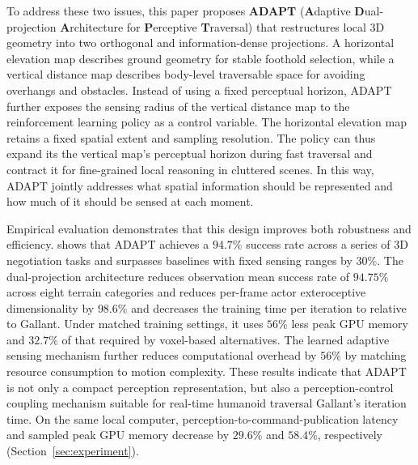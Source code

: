 \documentclass[letterpaper, 10 pt, conference]{ieeeconf/ieeeconf}
\providecommand{\DIFadd}[1]{{\protect\color{blue} \sf #1}} %
\providecommand{\DIFdel}[1]{{\protect\color{red} \scriptsize #1}} %
\providecommand{\DIFaddbegin}{} %
\providecommand{\DIFaddend}{} %
\providecommand{\DIFdelbegin}{} %
\providecommand{\DIFdelend}{} %
\begin{document}
To address these two issues, this paper proposes \textbf{ADAPT} (\textbf{A}daptive \textbf{D}ual-projection \textbf{A}rchitecture for \textbf{P}erceptive \textbf{T}raversal) that restructures local 3D geometry into two orthogonal and information-dense projections. A horizontal elevation map describes ground geometry for stable foothold selection, while a vertical distance map describes body-level traversable space for avoiding overhangs and obstacles. Instead of using a fixed perceptual horizon, ADAPT further exposes the sensing radius of the vertical distance map to the reinforcement learning policy as a control variable. The \DIFaddbegin \DIFadd{horizontal elevation map retains a fixed spatial extent and sampling resolution. The }\DIFaddend policy can thus expand \DIFdelbegin \DIFdel{its }\DIFdelend \DIFaddbegin \DIFadd{the vertical map's }\DIFaddend perceptual horizon during fast traversal and contract it for fine-grained local reasoning in cluttered scenes. In this way, ADAPT jointly addresses what spatial information should be represented and how much of it should be sensed at each moment.

Empirical evaluation \DIFdelbegin \DIFdel{demonstrates that this design improves both robustness and efficiency. }\DIFdelend \DIFaddbegin \DIFadd{shows that }\DIFaddend ADAPT achieves a \DIFdelbegin \DIFdel{$94.7\%$ success rate across a series of 3D negotiation tasks and surpasses baselines with fixed sensing ranges by $30\%$. The dual-projection architecture reduces observation }\DIFdelend \DIFaddbegin \DIFadd{mean success rate of $94.75\%$ across eight terrain categories and reduces per-frame actor exteroceptive }\DIFaddend dimensionality by $98.6\%$ \DIFdelbegin \DIFdel{and decreases the training time per iteration to }\DIFdelend \DIFaddbegin \DIFadd{relative to Gallant. Under matched training settings, it uses $56\%$ less peak GPU memory and }\DIFaddend $32.7\%$ of \DIFdelbegin \DIFdel{that required by voxel-based alternatives. The learned adaptive sensing mechanism further reduces computational overhead by $56\%$ by matching resource consumption to motion complexity. These results indicate that ADAPT is not only a compact perception representation, but also a perception-control coupling mechanism suitable for real-time humanoid traversal}\DIFdelend \DIFaddbegin \DIFadd{Gallant's iteration time. On the same local computer, perception-to-command-publication latency and sampled peak GPU memory decrease by $29.6\%$ and $58.4\%$, respectively (Section~\ref{sec:experiment})}\DIFaddend .
\end{document}
